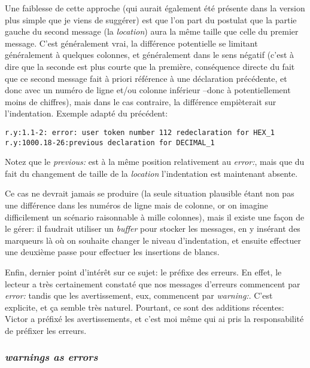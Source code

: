 \documentclass[a4paper,11pt,twoside,final]{article}
\begin{document}
  Une faiblesse de cette approche (qui aurait également été présente dans la
  version plus simple que je viens de suggérer) est que l'on part du postulat
  que la partie gauche du second message (la \textit{location}) aura la même
  taille que celle du premier message. C'est généralement vrai, la différence
  potentielle se limitant généralement à quelques colonnes, et généralement
  dans le sens négatif (c'est à dire que la seconde est plus courte que la
  première, conséquence directe du fait que ce second message fait à priori
  référence à une déclaration précédente, et donc avec un numéro de ligne et/ou
  colonne inférieur --donc à potentiellement moins de chiffres), mais dans le
  cas contraire, la différence empièterait sur l'indentation. Exemple adapté du
  précédent:

  \begin{verbatim}
r.y:1.1-2: error: user token number 112 redeclaration for HEX_1
r.y:1000.18-26:previous declaration for DECIMAL_1
  \end{verbatim}

  Notez que le \textit{previous:} est à la même position relativement au
  \textit{error:}, mais que du fait du changement de taille de la
  \textit{location} l'indentation est maintenant absente.

  Ce cas ne devrait jamais se produire (la seule situation plausible étant non
  pas une différence dans les numéros de ligne mais de colonne, or on imagine
  difficilement un scénario raisonnable à mille colonnes), mais il existe une
  façon de le gérer: il faudrait utiliser un \textit{buffer} pour stocker les
  messages, en y insérant des marqueurs là où on souhaite changer le niveau
  d'indentation, et ensuite effectuer une deuxième passe pour effectuer les
  insertions de blancs.

  Enfin, dernier point d'intérêt sur ce sujet: le préfixe des erreurs. En
  effet, le lecteur a très certainement constaté que nos messages d'erreurs
  commencent par \textit{error:} tandis que les avertissement, eux, commencent
  par \textit{warning:}. C'est explicite, et ça semble très naturel. Pourtant,
  ce sont des additions récentes: Victor a préfixé les avertissements, et c'est
  moi même qui ai pris la responsabilité de préfixer les erreurs.

  \subsubsection{\textit{warnings as errors}}
\end{document}
